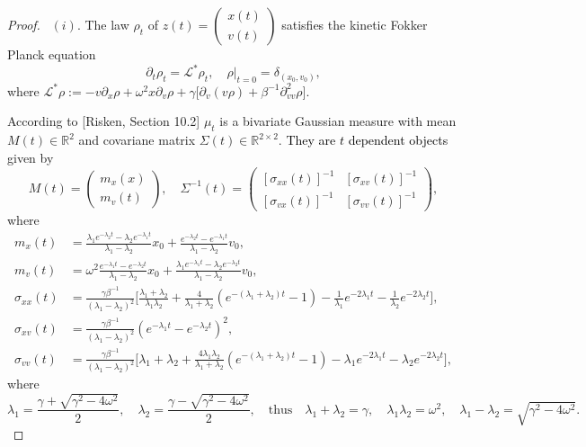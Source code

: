 \documentclass[a4paper,twoside]{article}      %
\theoremstyle{definition}
\newcommand{\AM}{\textcolor{black}}
\begin{document}
\begin{proof}\
$(i)$. The law $\rho_t$ of $z(t)=\begin{pmatrix}x(t)\\v(t)\end{pmatrix}$ satisfies the kinetic Fokker Planck equation
$$
\partial_t\rho_t=\mathscr{L}^*\rho_t, \quad \rho\vert_{t=0}=\delta_{(x_0,v_0)},
$$
where $\mathscr{L}^*\rho:=-v\partial_x\rho+\omega^2 x\partial_v\rho+\gamma \big[\partial_{v}(v \rho)+\beta^{-1}\partial^2_{vv}\rho\big]$.

According to [Risken, Section 10.2] $\mu_t$ is a bivariate Gaussian measure with mean $M(t)\in \mathbb{R}^2$ and covariane matrix $\Sigma(t)\in\mathbb{R}^{2\times 2}$. \AM{They are $t$ dependent objects} given by
$$
M(t)=\begin{pmatrix}
m_x(x)\\ m_v(t)
\end{pmatrix}, \quad \Sigma^{-1}(t)=\begin{pmatrix}
[\sigma_{xx}(t)]^{-1}&[\sigma_{xv}(t)]^{-1}\\
[\sigma_{vx}(t)]^{-1}&[\sigma_{vv}(t)]^{-1}
\end{pmatrix},
$$
where 
\begin{align*}
m_x(t)&=\frac{\lambda_1 e^{-\lambda_2 t}-\lambda_2 e^{-\lambda_1 t}}{\lambda_1-\lambda_2}x_0+\frac{e^{-\lambda_2 t}-e^{-\lambda_1 t}}{\lambda_1-\lambda_2}v_0,\\
m_v(t)&=\omega^2 \frac{e^{-\lambda_1 t}-e^{-\lambda_2 t}}{\lambda_1-\lambda_2} x_0+\frac{\lambda_1 e^{-\lambda_1 t}-\lambda_2 e^{-\lambda_2 t}}{\lambda_1-\lambda_2}v_0,\\
\sigma_{xx}(t)&=\frac{\gamma \beta^{-1}}{(\lambda_1-\lambda_2)^2}\Big[\frac{\lambda_1+\lambda_2}{\lambda_1\lambda_2}+\frac{4}{\lambda_1+\lambda_2}(e^{-(\lambda_1+\lambda_2)t}-1)-\frac{1}{\lambda_1}e^{-2\lambda_1 t}-\frac{1}{\lambda_2}e^{-2\lambda_2 t}\Big],\\
\sigma_{xv}(t)&=\frac{\gamma \beta^{-1}}{(\lambda_1-\lambda_2)^2}(e^{-\lambda_1 t}-e^{-\lambda_2 t})^2,\\
\sigma_{vv}(t)&=\frac{\gamma \beta^{-1}}{(\lambda_1-\lambda_2)^2}\Big[\lambda_1+\lambda_2+\frac{4\lambda_1\lambda_2}{\lambda_1+\lambda_2}(e^{-(\lambda_1+\lambda_2)t}-1)-\lambda	_1 e^{-2\lambda_1 t}-\lambda_2 e^{-2\lambda_2 t}\Big],
\end{align*} 
where
\begin{equation}
\label{eq: lambdas}
\lambda_{1}=\frac{\gamma+\sqrt{\gamma^2-4\omega^2}}{2},\quad \lambda_{2}=\frac{\gamma-\sqrt{\gamma^2-4\omega^2}}{2},\quad\text{thus}\quad \lambda_1+\lambda_2=\gamma,\quad \lambda_1\lambda_2=\omega^2,\quad \lambda_1-\lambda_2=\sqrt{\gamma^2-4\omega^2}.

\end{equation}
\end{proof}
\end{document}
